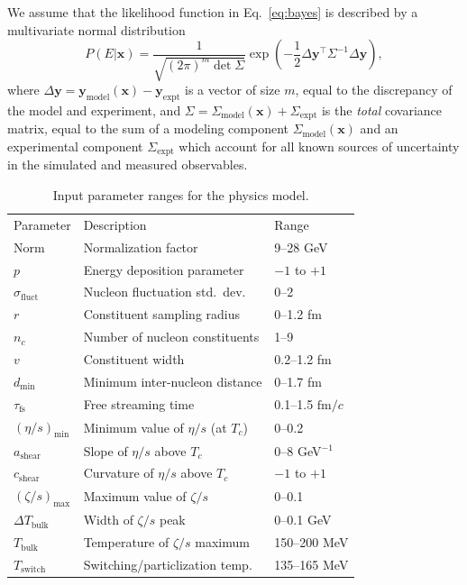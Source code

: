 \documentclass[aps,prc,reprint,amsmath,nofootinbib]{revtex4-1}
\newcommand{\fmc}{\ensuremath{\text{fm}/c}}
\newcommand{\sigmaf}{\sigma_\text{fluct}}
\newcommand{\taufs}{\tau_\text{fs}}
\newcommand{\dmin}{d_\text{min}}
\newcommand{\Tsw}{T_\text{switch}}
\newcommand{\smin}{{(\eta/s)_\mathrm{min}}}
\newcommand{\sslope}{{a_\mathrm{shear}}}
\newcommand{\scrv}{{c_\mathrm{shear}}}
\newcommand{\bmax}{{(\zeta/s)_\mathrm{max}}}
\newcommand{\bloc}{{T_\text{bulk}}}
\newcommand{\bwidth}{{\Delta T_\text{bulk}}}
\newcommand{\xv}{\mathbf x}
\newcommand{\yv}{\mathbf y}
\newcommand{\ym}{{\mathbf y}_\text{model}}
\newcommand{\ye}{{\mathbf y}_\text{expt}}
\newcommand{\Sigmam}{\Sigma_\text{model}}
\newcommand{\Sigmae}{\Sigma_\text{expt}}
\newcommand{\paddedhline}{\noalign{\smallskip}\hline\noalign{\smallskip}}
\begin{document}
We assume that the likelihood function in Eq.~\eqref{eq:bayes} is described by a multivariate normal distribution
\begin{equation}
  \label{eq:likelihood}
  P(E | \xv) = \frac{1}{\sqrt{(2\pi)^m \det \Sigma}} \exp \left ( -\frac{1}{2}\Delta\yv^\intercal \Sigma^{-1} \Delta\yv \right ),
\end{equation}
where $\Delta\yv = \ym(\xv) - \ye$ is a vector of size $m$, equal to the discrepancy of the model and experiment, and $\Sigma = \Sigmam(\xv) + \Sigmae$ is the \emph{total} covariance matrix, equal to the sum of a modeling component $\Sigmam(\xv)$ and an experimental component $\Sigmae$ which account for all known sources of uncertainty in the simulated and measured observables.

\begin{table}[t]
  \caption{Input parameter ranges for the physics model.}
  \begin{ruledtabular}
  \begin{tabular}{lll}
    Parameter         & Description                          & Range           \\
    \paddedhline
    Norm              & Normalization factor                 & 9--28 GeV       \\
    $p$               & Energy deposition parameter          & $-1$ to $+1$    \\
    $\sigmaf$         & Nucleon fluctuation std.\ dev.\      & 0--2            \\
    $r$               & Constituent sampling radius          & 0--1.2 fm       \\
    $n_c$             & Number of nucleon constituents       & 1--9            \\
    $v$               & Constituent width                    & 0.2--1.2 fm     \\
    $\dmin$           & Minimum inter-nucleon distance       & 0--1.7 fm       \\
    $\taufs$          & Free streaming time                  & 0.1--1.5 \fmc   \\
    $\smin$           & Minimum value of $\eta/s$ (at $T_c$) & 0--0.2          \\
    $\sslope$         & Slope of $\eta/s$ above $T_c$        & 0--8 GeV$^{-1}$ \\
    $\scrv$           & Curvature of $\eta/s$ above $T_c$    & $-1$ to $+1$    \\
    $\bmax$           & Maximum value of $\zeta/s$           & 0--0.1          \\
    $\bwidth$         & Width of $\zeta/s$ peak              & 0--0.1 GeV      \\
    $\bloc$           & Temperature of $\zeta/s$ maximum     & 150--200 MeV    \\
    $\Tsw$            & Switching/particlization temp.       & 135--165 MeV    \\
  \end{tabular}
  \end{ruledtabular}
  \label{tab:design}
\end{table}
\end{document}
